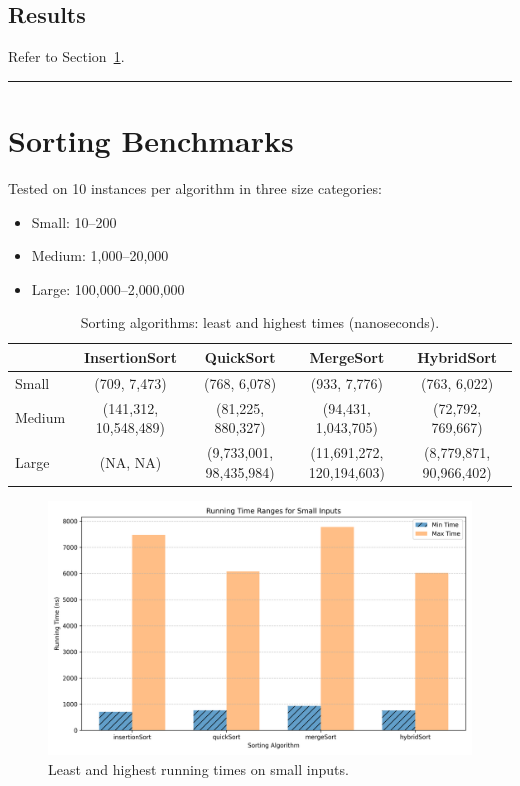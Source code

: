 \documentclass[12pt]{article}
\begin{document}
\subsection{Results}
Refer to Section~\ref{sec:sorting-benchmarks}.

\bigskip
\hrule height 1pt
\bigskip

\section{Sorting Benchmarks}\label{sec:sorting-benchmarks}

Tested on 10 instances per algorithm in three size categories:

\begin{itemize}
  \item Small: 10–200
  \item Medium: 1{,}000–20{,}000
  \item Large: 100{,}000–2{,}000{,}000
\end{itemize}

\begin{table}[H]
  \centering
  \setlength{\tabcolsep}{0.5pt}
  \begin{tabular}{lcccc}
    \toprule
      & InsertionSort     & QuickSort             & MergeSort            & HybridSort           \\ \midrule
    Small  & (709, 7{,}473)       & (768, 6{,}078)         & (933, 7{,}776)        & (763, 6{,}022)        \\
    Medium & (141{,}312, 10{,}548{,}489) & (81{,}225, 880{,}327)  & (94{,}431, 1{,}043{,}705) & (72{,}792, 769{,}667) \\
    Large  & (NA, NA)            & (9{,}733{,}001, 98{,}435{,}984) & (11{,}691{,}272, 120{,}194{,}603) & (8{,}779{,}871, 90{,}966{,}402) \\ 
    \bottomrule
  \end{tabular}
  \caption{Sorting algorithms: least and highest times (nanoseconds).}
\end{table}

\begin{figure}[H]
  \centering
  \includegraphics[width=0.7\linewidth]{sorting-stats-small.png}
  \caption{Least and highest running times on small inputs.}
\end{figure}
\end{document}
